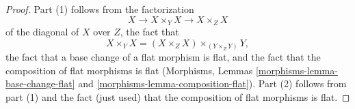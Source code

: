 \documentclass[10pt,a4paper]{amsart}
\theoremstyle{plain}
\theoremstyle{definition}
\theoremstyle{remark}
\numberwithin{equation}{subsection}
\begin{document}
\begin{proof}
Part (1) follows from the factorization
$$
X \to X \times_Y X \to X \times_Z X
$$
of the diagonal of $X$ over $Z$, the fact that
$$
X \times_Y X = (X \times_Z X) \times_{(Y \times_Z Y)} Y,
$$
the fact that a base change of a flat morphism is flat, and
the fact that the composition of flat morphisms is flat
(Morphisms, Lemmas \ref{morphisms-lemma-base-change-flat} and
\ref{morphisms-lemma-composition-flat}).
Part (2) follows from part (1) and the fact (just used)
that the composition of flat morphisms is flat.
\end{proof}
\end{document}
